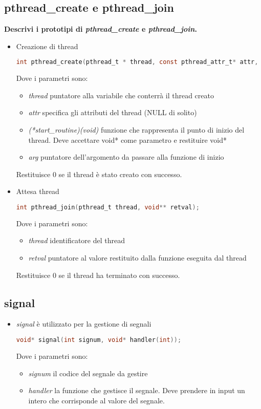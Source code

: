 \subsection{pthread\_create e pthread\_join}
\textbf{Descrivi i prototipi di \textit{pthread\_create} e \textit{pthread\_join}.}\\
\begin{itemize}
	\item Creazione di thread
	\begin{lstlisting}[language=C]
		int pthread_create(pthread_t * thread, const pthread_attr_t* attr, void * (*start_routine)(void), void* arg);
	\end{lstlisting}
	Dove i parametri sono:
	\begin{itemize}
		\item \textit{thread} puntatore alla variabile che conterrà il thread creato
		\item \textit{attr} specifica gli attributi del thread (NULL di solito)
		\item \textit{(*start\_routine)(void)} funzione che rappresenta il punto di inizio del thread. Deve accettare void* come parametro e restituire void*
		\item \textit{arg} puntatore dell'argomento da passare alla funzione di inizio
	\end{itemize}
	Restituisce $0$ se il thread è stato creato con successo.
	\item Attesa thread
	\begin{lstlisting}[language=C]
		int pthread_join(pthread_t thread, void** retval);
	\end{lstlisting}
	Dove i parametri sono:
	\begin{itemize}
		\item \textit{thread} identificatore del thread
		\item \textit{retval} puntatore al valore restituito dalla funzione eseguita dal thread
	\end{itemize}
	Restituisce $0$ se il thread ha terminato con successo.
\end{itemize}
\subsection{signal}
\begin{itemize}
	\item \textit{signal} è utilizzato per la gestione di segnali
	\begin{lstlisting}[language=C]
		void* signal(int signum, void* handler(int));
	\end{lstlisting}
	Dove i parametri sono:
	\begin{itemize}
		\item \textit{signum} il codice del segnale da gestire
		\item \textit{handler} la funzione che gestisce il segnale. Deve prendere in input un intero che corrisponde al valore del segnale.
	\end{itemize}
\end{itemize}
